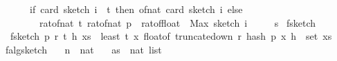 \begin{isabellebody}
\ \ \ \ \ \ {\isacharparenleft}{\kern0pt}if\ card\ {\isacharparenleft}{\kern0pt}sketch\ i{\isacharparenright}{\kern0pt}\ {\isacharless}{\kern0pt}\ t\ then\ of{\isacharunderscore}{\kern0pt}nat\ {\isacharparenleft}{\kern0pt}card\ {\isacharparenleft}{\kern0pt}sketch\ i{\isacharparenright}{\kern0pt}{\isacharparenright}{\kern0pt}\ else\isanewline
\ \ \ \ \ \ \ \ rat{\isacharunderscore}{\kern0pt}of{\isacharunderscore}{\kern0pt}nat\ t{\isacharasterisk}{\kern0pt}\ rat{\isacharunderscore}{\kern0pt}of{\isacharunderscore}{\kern0pt}nat\ p\ {\isacharslash}{\kern0pt}\ rat{\isacharunderscore}{\kern0pt}of{\isacharunderscore}{\kern0pt}float\ \ {\isacharparenleft}{\kern0pt}Max\ {\isacharparenleft}{\kern0pt}sketch\ i{\isacharparenright}{\kern0pt}{\isacharparenright}{\kern0pt}{\isacharparenright}{\kern0pt}\isanewline
\ \ \ \ {\isacharparenright}{\kern0pt}\ s{\isacharparenright}{\kern0pt}{\isachardoublequoteclose}\isanewline
\isanewline
{}\isamarkupfalse%
\ f{}{\isacharunderscore}{\kern0pt}sketch\ \ \isanewline
\ \ {\isachardoublequoteopen}f{}{\isacharunderscore}{\kern0pt}sketch\ p\ r\ t\ h\ xs\ {\isacharequal}{\kern0pt}\ least\ t\ {\isacharparenleft}{\kern0pt}{\isacharparenleft}{\kern0pt}{\isasymlambda}x{\isachardot}{\kern0pt}\ float{\isacharunderscore}{\kern0pt}of\ {\isacharparenleft}{\kern0pt}truncate{\isacharunderscore}{\kern0pt}down\ r\ {\isacharparenleft}{\kern0pt}hash\ p\ x\ h{\isacharparenright}{\kern0pt}{\isacharparenright}{\kern0pt}{\isacharparenright}{\kern0pt}\ {\isacharbackquote}{\kern0pt}\ {\isacharparenleft}{\kern0pt}set\ xs{\isacharparenright}{\kern0pt}{\isacharparenright}{\kern0pt}{\isachardoublequoteclose}\isanewline
\isanewline
{}\isamarkupfalse%
\ f{}{\isacharunderscore}{\kern0pt}alg{\isacharunderscore}{\kern0pt}sketch{\isacharcolon}{\kern0pt}\isanewline
\ \ \ n\ {\isacharcolon}{\kern0pt}{\isacharcolon}{\kern0pt}\ nat\isanewline
\ \ \ as\ {\isacharcolon}{\kern0pt}{\isacharcolon}{\kern0pt}\ {\isachardoublequoteopen}nat\ list{\isachardoublequoteclose}\isanewline
\ \ \ {\isachardoublequoteopen}{\isasymepsilon}\ {\isasymin}\ {\isacharbraceleft}{\kern0pt}{}{\isacharless}{\kern0pt}{\isachardot}{\kern0pt}{\isachardot}{\kern0pt}{\isacharless}{\kern0pt}{}{\isacharbraceright}{\kern0pt}{\isachardoublequoteclose}\isanewline
\ \ \ {\isachardoublequoteopen}{\isasymdelta}\ {\isasymin}\ {\isacharbraceleft}{\kern0pt}{}{\isacharless}{\kern0pt}{\isachardot}{\kern0pt}{\isachardot}{\kern0pt}{\isacharless}{\kern0pt}{}{\isacharbraceright}{\kern0pt}{\isachardoublequoteclose}\isanewline

\end{isabellebody}
